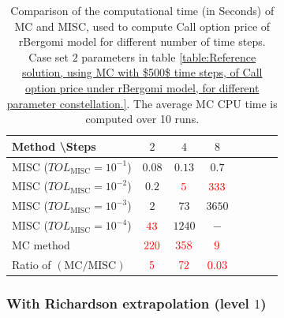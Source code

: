 \begin{table}[h!]
	\centering
	\begin{tabular}{l*{6}{c}r}
		Method \textbackslash  Steps            & $2$ & $4$ & $8$   \\
		\hline
		MISC ($TOL_{\text{MISC}}=10^{-1}$)  & $0.08$ & $0.13$ & $0.7$   \\
		MISC ($TOL_{\text{MISC}}=10^{-2}$)  & $0.2$& ${\color{red}5}$ & ${\color{red}333}$   \\
		MISC ($TOL_{\text{MISC}}=10^{-3}$)  &  $2$ & $73$ & $3650$  \\		
		MISC ($TOL_{\text{MISC}}=10^{-4}$)  & ${\color{red}43}$ & $1240$ & $-$  \\	
	
		\hline
		MC method & ${\color{red}220}$  & ${\color{red}358}$  & ${\color{red}9}$  \\
		\hline	
		Ratio of $\left(\text{MC}/ \text{MISC} \right)$  &${\color{red}5}$ & ${\color{red}   72 
		}$  & ${\color{red}  0.03	}$   \\
		\hline
	\end{tabular}
	\caption{Comparison of the computational time (in Seconds) of  MC and MISC, used to compute Call option price of rBergomi model for different number of time steps. Case  set $2$ parameters in table \ref{table:Reference solution, using MC with $500$ time steps, of Call option price under rBergomi model, for different parameter constellation.}. The
		average MC CPU time is computed over 10 runs.}
	\label{Comparsion of the computational time of  MC and MISC, used to compute Call option price of rBergomi model for different number of time steps. Case $K=1, H=0.07$, linear}
\end{table}

\FloatBarrier
\subsubsection*{With Richardson extrapolation (level $1$)}

